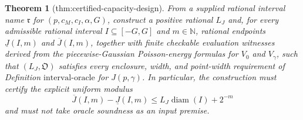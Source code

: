 \documentclass{article}
\newtheorem{theorem}{Theorem}
\begin{document}
\begin{theorem}[thm:certified-capacity-design]\label{thm:certified-capacity-design}
From a supplied rational interval name \(\mathfrak r\) for \((p,c_M,c_I,\alpha,G)\), construct a positive rational \(L_J\) and, for every admissible rational interval \(I\subseteq[-G,G]\) and \(m\in\mathbb N\), rational endpoints \(\underline J(I,m)\) and \(\overline J(I,m)\), together with finite checkable evaluation witnesses derived from the piecewise-Gaussian Poisson-energy formulas for \(V_0\) and \(V_\gamma\), such that \((L_J,\mathfrak O)\) satisfies every enclosure, width, and point-width requirement of Definition \(\mathrm{interval\mbox{-}oracle}\) for \(J(p,\gamma)\).  In particular, the construction must certify the explicit uniform modulus
\[
 \overline J(I,m)-\underline J(I,m)
 \leq L_J\operatorname{diam}(I)+2^{-m}
\]
and must not take oracle soundness as an input premise.
\end{theorem}
\end{document}
